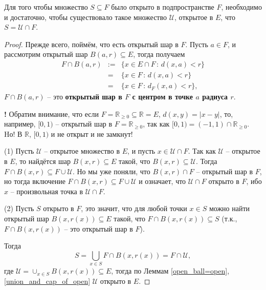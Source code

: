 \begin{proposition}\label{open_in_subset}
    Для того чтобы множество $S \subseteq F$ было открыто в подпространстве $F$, необходимо и достаточно, чтобы существовало такое множество $\mathscr{U}$, открытое в $E$, что $S = \mathscr{U} \cap F.$
\end{proposition}

\begin{proof}
    Прежде всего, поймём, что есть открытый шар в $F$. Пусть $a \in F$, и рассмотрим открытый шар $B(a,r) \subseteq E$, тогда получаем
    \begin{eqnarray*}
        F \cap B(a,r) &:=& \{x \in E \cap F\, :\, d(x,a)<r\} \\
        &=&\{x\in F\, :\, d(x,a)<r\} \\
        &=& \{x \in F\, :\, d_F(x,a)<r\},
    \end{eqnarray*}
    \ie $F \cap B(a,r)$ -- это \textbf{открытый шар в $F$ с центром в точке $a$ радиуса $r.$}

\begin{mydanger}{\bf{!}}
    Обратим внимание, что если $F = \mathbb{R}_{\ge 0} \subseteq \mathbb{R} = E$, $d(x,y) = |x-y|$, то, например, $[0,1)$ -- открытый шар в $F = \mathbb{R}_{\ge 0}$, так как $[0,1) = (-1,1) \cap \mathbb{R}_{\ge 0}$. Hо! В $\mathbb{R}$, $[0,1)$ и не открыт и не замкнут!
\end{mydanger}

(1) Пусть $\mathscr{U}$ -- открытое множество в $E$, и пусть $x \in \mathscr{U} \cap F$. Так как $\mathscr{U}$ -- открытое в $E$, то найдётся шар $B(x,r) \subseteq E$ такой, что $B(x,r) \subseteq \mathscr{U}$. Тогда $F \cap B(x,r) \subseteq F \cup \mathscr{U}$. Но мы уже поняли, что $B(x,r) \cap F$ -- открытый шар в $F$, но тогда включение $F \cap B(x,r) \subseteq F \cup \mathscr{U}$ и означает, что $\mathscr{U} \cap F$ открыто в $F$, ибо $x$ -- произвольная точка в $\mathscr{U} \cap F.$

(2) Пусть $S$ открыто в $F$, это значит, что для любой точки $x \in S$ можно найти открытый шар $B(x, r(x)) \subseteq E$ такой, что $F \cap B(x,r(x)) \subseteq S$ (т.к., $F \cap B(x,r(x))$ -- это открытый шар в $F$).

Тогда 
\[
 S = \bigcup_{x \in S} F \cap B(x, r(x)) = F \cap \mathscr{U},
\]
где $\mathscr{U} = \cup_{x\in S} B(x, r(x)) \subseteq E$, тогда по Леммам \ref{open_ball=open}, \ref{union_and_cap_of_open} $\mathscr{U}$ открыто в $E$.
\end{proof}








